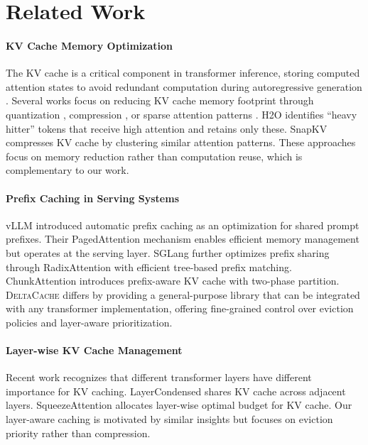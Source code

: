 \documentclass{article}
\newcommand{\deltacache}{\textsc{DeltaCache}}
\begin{document}
\section{Related Work}
\label{sec:related}

\paragraph{KV Cache Memory Optimization}
The KV cache is a critical component in transformer inference, storing computed attention states to avoid redundant computation during autoregressive generation \citep{vaswani2017attention}.
Several works focus on reducing KV cache memory footprint through quantization \citep{liu2024kivi,hooper2024kvquant}, compression \citep{ge2023model}, or sparse attention patterns \citep{child2019generating,xiao2024efficient}.
H2O \citep{zhang2024h2o} identifies ``heavy hitter'' tokens that receive high attention and retains only these.
SnapKV \citep{snapkv2024} compresses KV cache by clustering similar attention patterns.
These approaches focus on memory reduction rather than computation reuse, which is complementary to our work.

\paragraph{Prefix Caching in Serving Systems}
vLLM \citep{kwon2023efficient} introduced automatic prefix caching as an optimization for shared prompt prefixes.
Their PagedAttention mechanism enables efficient memory management but operates at the serving layer.
SGLang \citep{zheng2023efficiently} further optimizes prefix sharing through RadixAttention with efficient tree-based prefix matching.
ChunkAttention \citep{ye2024chunkattention} introduces prefix-aware KV cache with two-phase partition.
\deltacache{} differs by providing a general-purpose library that can be integrated with any transformer implementation, offering fine-grained control over eviction policies and layer-aware prioritization.

\paragraph{Layer-wise KV Cache Management}
Recent work recognizes that different transformer layers have different importance for KV caching.
LayerCondensed \citep{layercondensed2024} shares KV cache across adjacent layers.
SqueezeAttention \citep{squeezeattention2025} allocates layer-wise optimal budget for KV cache.
Our layer-aware caching is motivated by similar insights but focuses on eviction priority rather than compression.
\end{document}
